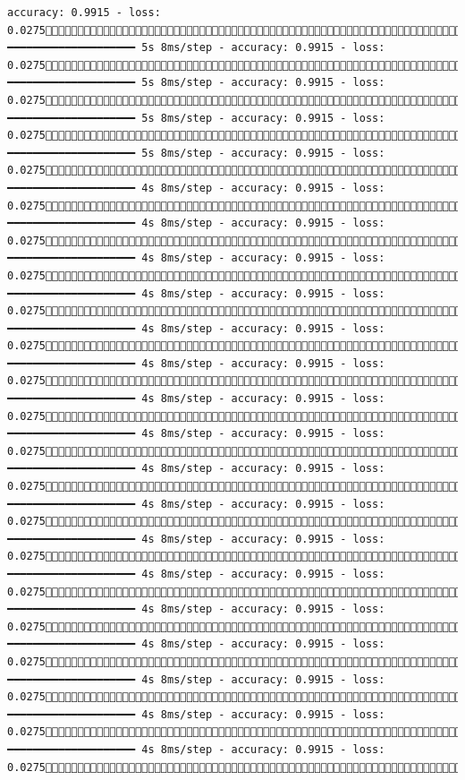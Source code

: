 \documentclass[
  letterpaper,
  DIV=11,
  numbers=noendperiod]{scrreprt}
\begin{document}
\begin{verbatim}
accuracy: 0.9915 - loss: 0.02751210/1875 ━━━━━━━━━━━━━━━━━━━━ 5s 8ms/step - accuracy: 0.9915 - loss: 0.02751216/1875 ━━━━━━━━━━━━━━━━━━━━ 5s 8ms/step - accuracy: 0.9915 - loss: 0.02751222/1875 ━━━━━━━━━━━━━━━━━━━━ 5s 8ms/step - accuracy: 0.9915 - loss: 0.02751229/1875 ━━━━━━━━━━━━━━━━━━━━ 5s 8ms/step - accuracy: 0.9915 - loss: 0.02751236/1875 ━━━━━━━━━━━━━━━━━━━━ 4s 8ms/step - accuracy: 0.9915 - loss: 0.02751243/1875 ━━━━━━━━━━━━━━━━━━━━ 4s 8ms/step - accuracy: 0.9915 - loss: 0.02751250/1875 ━━━━━━━━━━━━━━━━━━━━ 4s 8ms/step - accuracy: 0.9915 - loss: 0.02751258/1875 ━━━━━━━━━━━━━━━━━━━━ 4s 8ms/step - accuracy: 0.9915 - loss: 0.02751265/1875 ━━━━━━━━━━━━━━━━━━━━ 4s 8ms/step - accuracy: 0.9915 - loss: 0.02751272/1875 ━━━━━━━━━━━━━━━━━━━━ 4s 8ms/step - accuracy: 0.9915 - loss: 0.02751280/1875 ━━━━━━━━━━━━━━━━━━━━ 4s 8ms/step - accuracy: 0.9915 - loss: 0.02751288/1875 ━━━━━━━━━━━━━━━━━━━━ 4s 8ms/step - accuracy: 0.9915 - loss: 0.02751295/1875 ━━━━━━━━━━━━━━━━━━━━ 4s 8ms/step - accuracy: 0.9915 - loss: 0.02751302/1875 ━━━━━━━━━━━━━━━━━━━━ 4s 8ms/step - accuracy: 0.9915 - loss: 0.02751308/1875 ━━━━━━━━━━━━━━━━━━━━ 4s 8ms/step - accuracy: 0.9915 - loss: 0.02751314/1875 ━━━━━━━━━━━━━━━━━━━━ 4s 8ms/step - accuracy: 0.9915 - loss: 0.02751320/1875 ━━━━━━━━━━━━━━━━━━━━ 4s 8ms/step - accuracy: 0.9915 - loss: 0.02751326/1875 ━━━━━━━━━━━━━━━━━━━━ 4s 8ms/step - accuracy: 0.9915 - loss: 0.02751332/1875 ━━━━━━━━━━━━━━━━━━━━ 4s 8ms/step - accuracy: 0.9915 - loss: 0.02751338/1875 ━━━━━━━━━━━━━━━━━━━━ 4s 8ms/step - accuracy: 0.9915 - loss: 0.02751345/1875 ━━━━━━━━━━━━━━━━━━━━ 4s 8ms/step - accuracy: 0.9915 - loss: 0.02751352/1875 
\end{verbatim}
\end{document}
